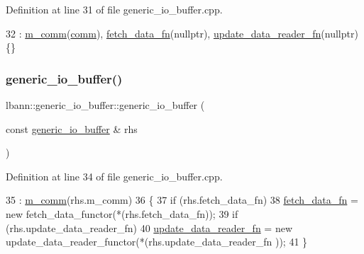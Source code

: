 Definition at line 31 of file generic\+\_\+io\+\_\+buffer.\+cpp.


\begin{DoxyCode}
32   : \hyperlink{classlbann_1_1generic__io__buffer_a2e4a46c85c8b30e10b1cc5acaa2c4cca}{m\_comm}(\hyperlink{file__io_8cpp_ab048c6f9fcbcfaa57ce68b00263dbebe}{comm}), \hyperlink{classlbann_1_1generic__io__buffer_a267170b4fd11dc60c782a9cb2b7b06cc}{fetch\_data\_fn}(\textcolor{keyword}{nullptr}),  
      \hyperlink{classlbann_1_1generic__io__buffer_a031eda7559a9e241afb3958b56088560}{update\_data\_reader\_fn}(\textcolor{keyword}{nullptr}) \{\}
\end{DoxyCode}
\mbox{\label{classlbann_1_1generic__io__buffer_a0810bd8f8c803aa992e4c29b4eee3506}} 
\subsubsection{\texorpdfstring{generic\+\_\+io\+\_\+buffer()}{generic\_io\_buffer()}\hspace{0.1cm}{\footnotesize\ttfamily [2/2]}}
{\footnotesize\ttfamily lbann\+::generic\+\_\+io\+\_\+buffer\+::generic\+\_\+io\+\_\+buffer (\begin{DoxyParamCaption}\item[{const \hyperlink{classlbann_1_1generic__io__buffer}{generic\+\_\+io\+\_\+buffer} \&}]{rhs }\end{DoxyParamCaption})}



Definition at line 34 of file generic\+\_\+io\+\_\+buffer.\+cpp.


\begin{DoxyCode}
35 : \hyperlink{classlbann_1_1generic__io__buffer_a2e4a46c85c8b30e10b1cc5acaa2c4cca}{m\_comm}(rhs.m\_comm)
36 \{
37   \textcolor{keywordflow}{if} (rhs.fetch\_data\_fn)
38     \hyperlink{classlbann_1_1generic__io__buffer_a267170b4fd11dc60c782a9cb2b7b06cc}{fetch\_data\_fn} = \textcolor{keyword}{new} fetch\_data\_functor(*(rhs.fetch\_data\_fn));
39   \textcolor{keywordflow}{if} (rhs.update\_data\_reader\_fn)
40     \hyperlink{classlbann_1_1generic__io__buffer_a031eda7559a9e241afb3958b56088560}{update\_data\_reader\_fn} = \textcolor{keyword}{new} update\_data\_reader\_functor(*(rhs.update\_data\_reader\_fn
      ));
41 \}
\end{DoxyCode}
\mbox{\label{classlbann_1_1generic__io__buffer_a0b531621374f697db06d8a3feec095cf}} 
